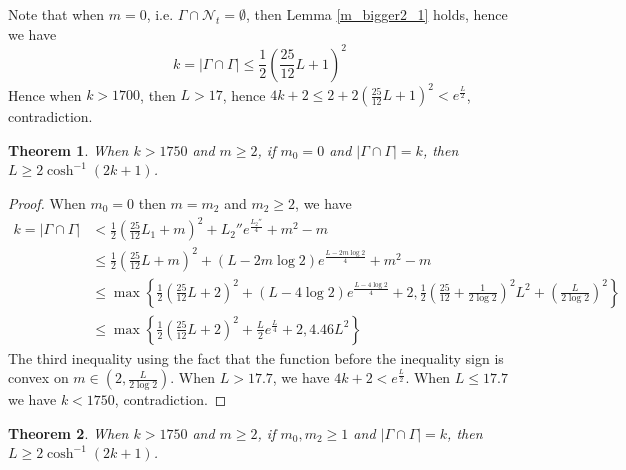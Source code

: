 \documentclass[11pt, a4paper]{article}
\newtheorem{thm}{Theorem}[section]
\theoremstyle{definition}
\theoremstyle{remark}
\newcommand{\caln}{\mathcal{N}}
\newcommand{\abs}[1]{\left| #1 \right|}
\newcommand{\bracket}[1]{\left( #1 \right)}
\begin{document}
Note that when $m=0$, i.e. $\Gamma\cap\caln_t=\emptyset$, then Lemma \ref{m_bigger2_1} holds, hence we have
$$k=\abs{\Gamma\cap\Gamma}\leqslant\frac12\bracket{\frac{25}{12}L+1}^2$$
Hence when $k>1700$, then $L>17$, hence $4k+2\leqslant2+2\bracket{\frac{25}{12}L+1}^2<e^{\frac{L}2}$, contradiction.































\begin{thm}\label{m_bigger2_02} 
 When $k>1750$ and $m\geqslant2$, if $m_0=0$ and $\abs{\Gamma\cap\Gamma}=k$, then $L\geqslant2\cosh^{-1}(2k+1)$. 
\end{thm}

\begin{proof}
When $m_0=0$ then $m=m_2$ and $m_2\geqslant2$, we have
\begin{align*}
k=\abs{\Gamma\cap\Gamma}&<\frac12\bracket{\frac{25}{12}L_1+m}^2+{L_2''}e^{\frac{L_2''}4}+m^2-m\\
&\leqslant\frac12\bracket{\frac{25}{12}L+m}^2+({L-2m\log2})e^{\frac{L-2m\log2}4}+m^2-m\\
&\leqslant\max\left\{\frac12\bracket{\frac{25}{12}L+2}^2+(L-4\log2)e^{\frac{L-4\log2}4}+2, \frac12\bracket{\frac{25}{12}+\frac1{2\log2}}^2L^2+\bracket{\frac{L}{2\log2}}^2\right\}\\
&\leqslant\max\left\{\frac12\bracket{\frac{25}{12}L+2}^2+\frac{L}2e^{\frac{L}4}+2,4.46L^2\right\}
\end{align*}
The third inequality using the fact that the function before the inequality sign is convex on $m\in(2,\frac{L}{2\log2})$. 
When $L>17.7$, we have $4k+2<e^{\frac{L}2}$. When $L\leqslant17.7$ we have $k<1750$, contradiction.

\end{proof}








\begin{thm}\label{m_bigger2_03} 
 When $k>1750$ and $m\geqslant2$, if $m_0,m_2\geqslant1$ and $\abs{\Gamma\cap\Gamma}=k$, then $L\geqslant2\cosh^{-1}(2k+1)$. 
\end{thm}
\end{document}
